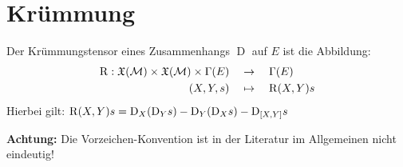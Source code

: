 \chapter{Krümmung}

\begin{defs}[Krümmungstensor]
Der Krümmungstensor eines Zusammenhangs $\operatorname{D}$ auf $E$ ist die Abbildung:
\begin{align*}
\operatorname{R}: \mathfrak{X}(\mathcal{M}) \times \mathfrak{X}(\mathcal{M}) \times \Gamma(E) \quad &\rightarrow \quad \Gamma(E) \\
(X, Y, s) \quad &\mapsto \quad \operatorname{R}(X,Y)s \\
\end{align*}
Hierbei gilt:  \quad $\operatorname{R}(X,Y)s = \mathrm{D}_X(\mathrm{D}_Ys) - \mathrm{D}_Y(\mathrm{D}_Xs) - \mathrm{D}_{[X,Y]}s$
\end{defs}

\textbf{Achtung:} Die Vorzeichen-Konvention ist in der Literatur im Allgemeinen nicht eindeutig!

